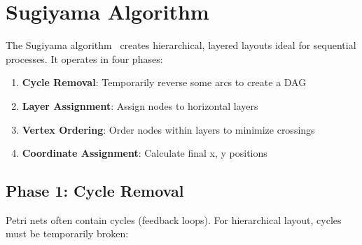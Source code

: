 \section{Sugiyama Algorithm}
\label{sec:sugiyama}

The Sugiyama algorithm~\cite{Sugiyama1981} creates hierarchical, layered layouts ideal for sequential processes. It operates in four phases:

\begin{enumerate}
    \item \textbf{Cycle Removal}: Temporarily reverse some arcs to create a DAG
    \item \textbf{Layer Assignment}: Assign nodes to horizontal layers
    \item \textbf{Vertex Ordering}: Order nodes within layers to minimize crossings
    \item \textbf{Coordinate Assignment}: Calculate final x, y positions
\end{enumerate}

\subsection{Phase 1: Cycle Removal}

Petri nets often contain cycles (feedback loops). For hierarchical layout, cycles must be temporarily broken:

